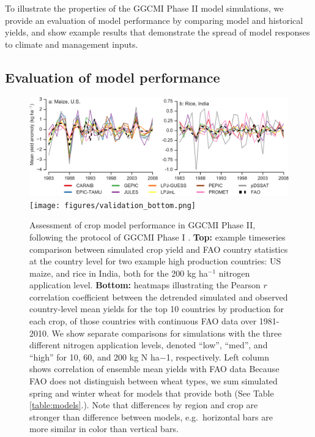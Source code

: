 \documentclass[gmd, manuscript]{copernicus} %
\begin{document}
To illustrate the properties of the GGCMI Phase II model simulations, we provide an evaluation of model performance by comparing model and historical yields, and show example results that demonstrate the spread of model responses to climate and management inputs. 

\subsection{Evaluation of model performance}
\begin{figure}[ht]
    \centering
    \includegraphics[width=14cm]{figures/validation_top.png}
    \texttt{[image: figures/validation\_bottom.png]}
    \caption{Assessment of crop model performance in GGCMI Phase II, following the protocol of GGCMI Phase I \citep{muller_global_2017}. 
    \textbf{Top:} example timeseries comparison between simulated crop yield and FAO country statistics \citep{FAOSTAT} at the country level for two example high production countries: US maize, and rice in India, both for the 200 kg ha$^{-1}$ nitrogen application level. 
    \textbf{Bottom:} heatmaps illustrating the Pearson $r$ correlation coefficient between the detrended simulated and observed country-level mean yields for the top 10 countries by production for each crop, of those countries with continuous FAO data over 1981-2010.
    We show separate comparisons for simulations with the three different nitrogen application levels, denoted “low”, “med”, and “high” for 10, 60, and 200 kg N ha−1, respectively. 
    Left column shows correlation of ensemble mean yields with FAO data 
    Because FAO does not distinguish between wheat types, we sum simulated spring and winter wheat for models that provide both (See Table \ref{table:models}.). 
    Note that differences by region and crop are stronger than difference between models, e.g.\ horizontal bars are more similar in color than vertical bars.}
    \label{fig:simulation_val}
\end{figure}
\end{document}
